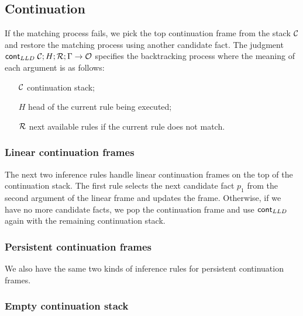 

\subsection{Continuation}\label{sec:lld_match_cont}

If the matching process fails, we pick the top continuation frame from the stack
$\mathcal{C}$ and restore the matching process using another candidate fact. The judgment
\mbox{$\mathsf{cont}_{LLD} \; \mathcal{C}; H; \mathcal{R}; \Gamma \rightarrow \mathcal{O}$} specifies the
backtracking process where the meaning of each argument is as follows:

\begin{enumerate}
   \item[$\mathcal{C}$] continuation stack;
   \item[$H$] head of the current rule being executed;

   \item[$\mathcal{R}$] next available rules if the current rule does not match.

\end{enumerate}

\subsubsection{Linear continuation frames}

The next two inference rules handle linear continuation frames on the top of the
continuation stack. The first rule selects the next candidate fact $p_1$ from the
second argument of the linear frame and updates the frame. Otherwise, if we have
no more candidate facts, we pop the continuation frame and use $\mathsf{cont}_{LLD} \;$again with
the remaining continuation stack.



\subsubsection{Persistent continuation frames}

We also have the same two kinds of inference rules for persistent continuation
frames.



\subsubsection{Empty continuation stack}

